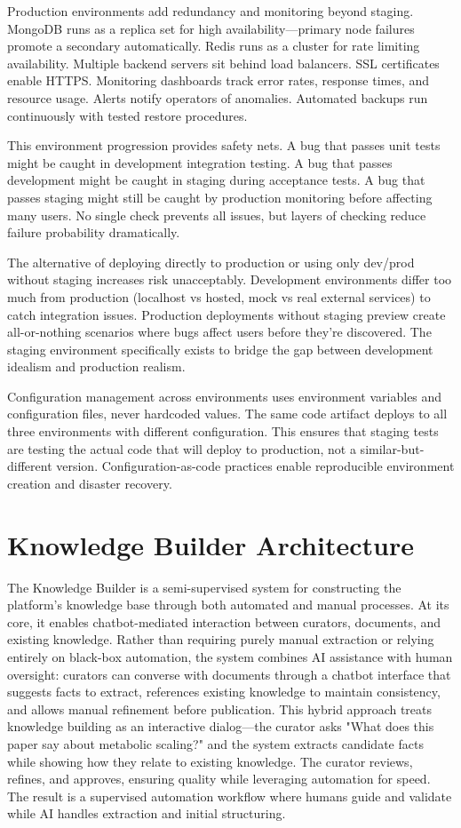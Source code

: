 \documentclass[12pt,a4paper]{article}
\begin{document}
Production environments add redundancy and monitoring beyond staging. MongoDB runs as a replica set for high availability—primary node failures promote a secondary automatically. Redis runs as a cluster for rate limiting availability. Multiple backend servers sit behind load balancers. SSL certificates enable HTTPS. Monitoring dashboards track error rates, response times, and resource usage. Alerts notify operators of anomalies. Automated backups run continuously with tested restore procedures.

This environment progression provides safety nets. A bug that passes unit tests might be caught in development integration testing. A bug that passes development might be caught in staging during acceptance tests. A bug that passes staging might still be caught by production monitoring before affecting many users. No single check prevents all issues, but layers of checking reduce failure probability dramatically.

The alternative of deploying directly to production or using only dev/prod without staging increases risk unacceptably. Development environments differ too much from production (localhost vs hosted, mock vs real external services) to catch integration issues. Production deployments without staging preview create all-or-nothing scenarios where bugs affect users before they're discovered. The staging environment specifically exists to bridge the gap between development idealism and production realism.

Configuration management across environments uses environment variables and configuration files, never hardcoded values. The same code artifact deploys to all three environments with different configuration. This ensures that staging tests are testing the actual code that will deploy to production, not a similar-but-different version. Configuration-as-code practices enable reproducible environment creation and disaster recovery.

\section{Knowledge Builder Architecture}

The Knowledge Builder is a semi-supervised system for constructing the platform's knowledge base through both automated and manual processes. At its core, it enables chatbot-mediated interaction between curators, documents, and existing knowledge. Rather than requiring purely manual extraction or relying entirely on black-box automation, the system combines AI assistance with human oversight: curators can converse with documents through a chatbot interface that suggests facts to extract, references existing knowledge to maintain consistency, and allows manual refinement before publication. This hybrid approach treats knowledge building as an interactive dialog—the curator asks "What does this paper say about metabolic scaling?" and the system extracts candidate facts while showing how they relate to existing knowledge. The curator reviews, refines, and approves, ensuring quality while leveraging automation for speed. The result is a supervised automation workflow where humans guide and validate while AI handles extraction and initial structuring.
\end{document}
